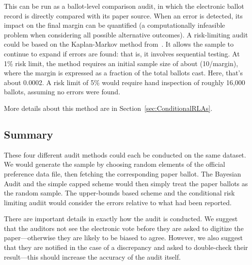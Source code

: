 \documentclass[10pt,a4paper]{article}
\newcommand{\shortVersion}[1]{}
\newcommand{\longVersion}[1]{#1}
\newcommand{\shortVersion}[1]{#1}
\newcommand{\longVersion}[1]{}
\begin{document}
This can be run as a ballot-level comparison audit, in which the electronic ballot record is directly compared with its paper source.  When an error is detected, its impact on the final margin can be quantified  (a computationally infeasible problem when considering all possible alternative outcomes).  
A risk-limiting audit could be based on the Kaplan-Markov  method from~\cite{stark2008conservative}.  It allows the sample to continue to expand if errors are found: that is, it involves sequential testing. 
At 1\% risk limit, the method requires an initial sample size of about (10/margin), where the margin is expressed as a fraction of the total ballots cast. Here, that's about 0.0002.
A risk limit of 5\% would require hand inspection of roughly 16,000 ballots, assuming no errors were found.

\shortVersion{}\longVersion{More details about this method are in Section~\ref{sec:ConditionalRLAs}.}

\subsection{Summary}
These four different audit methods could each be conducted on the same dataset.  We would generate the sample by choosing random elements of the official preference data file, then fetching the corresponding paper ballot.  The Bayesian Audit and the simple capped scheme would then simply treat the paper ballots as the random sample.  The upper-bounds based scheme and the conditional risk limiting audiit would consider the errors relative to what had been reported.

There are important details in exactly how the audit is conducted.  We suggest that the auditors not see the electronic vote before they are asked to digitize the paper---otherwise they are likely to be biased to agree.  However, we also suggest that they are notified in the case of a discrepancy and asked to double-check their result---this should increase the accuracy of the audit itself.
\end{document}
